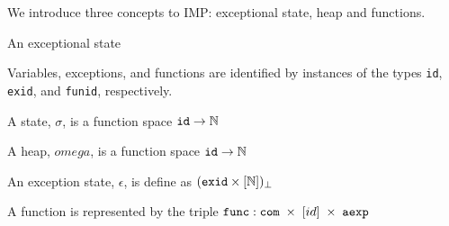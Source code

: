 We introduce three concepts to IMP: exceptional state, heap and functions.

An exceptional state



Variables, exceptions, and functions are identified by instances of the types \verb|id|, \verb|exid|, and \verb|funid|, respectively.

A state, $\sigma$, is a function space $\verb|id| \rightarrow \mathbb{N}$

A heap, $omega$, is a function space $\verb|id| \rightarrow \mathbb{N}$

An exception state, $\epsilon$, is define as $(\verb|exid|\times[\mathbb{N}])_\bot$

A function is represented by the triple $\verb|func|: \verb|com| \; \times \; [id] \; \times \; \verb|aexp|$